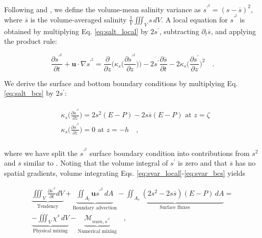 \documentclass[draft]{agujournal2019}
\begin{document}
Following  and , we define the volume-mean salinity variance as $s^{\prime^2} = (s-\overline{s})^2$, where $\overline{s}$ is the volume-averaged salinity $\frac{1}{V} \iiint_V s \, dV$. A local equation for $s^{\prime^2}$ is obtained by multiplying Eq. \ref{eq:salt_local} by $2s^{\prime}$, subtracting $\partial_t \overline{s}$, and applying the product rule:
\begin{linenomath*}
\begin{equation} \label{eq:svar_local}
    \frac{\partial s^{\prime^2}}{\partial t} + \textbf{u} \cdot \nabla s^{\prime^2}   = \frac{\partial}{\partial z} \bigg(\kappa_s \bigg(\frac{\partial s^{\prime^2}}{\partial z} \bigg) \bigg) - 2s^{\prime} \frac{\partial \overline{s}}{\partial t} -2 \kappa_s \bigg(\frac{\partial s^\prime}{\partial z} \bigg)^2 \quad .
\end{equation}
\end{linenomath*}
We derive the surface and bottom boundary conditions by multiplying Eq. \ref{eq:salt_bcs} by $2s^{\prime}$:
\begin{linenomath*}
\begin{align} \label{eq:svar_bcs}
    \begin{split}
         & \kappa_s \bigg({\frac{\partial s^{\prime^2}}{\partial z}} \bigg) = 2s^2(E-P) -2s \overline{s}(E-P) \,\, \textrm{at} \,\, z = \zeta \\
         & \kappa_s \bigg({\frac{\partial s^{\prime^2}}{\partial z}} \bigg) = 0 \,\, \textrm{at} \,\, z = -h \quad ,\\
    \end{split}
\end{align}
\end{linenomath*}
where we have split the $s^{\prime^2}$ surface boundary condition into contributions from $s^2$ and $\overline{s}$ similar to . 
Noting that the volume integral of $s^\prime$ is zero and that $\overline{s}$ has no spatial gradients, volume integrating Eqs.  \ref{eq:svar_local}-\ref{eq:svar_bcs} yields
\begin{linenomath*}
\begin{equation} \label{eq:svar_int}
    \begin{split}
        \underbrace{\iiint_V \frac{\partial s^{\prime^2}}{\partial t} dV}_{\text{Tendency}} + \underbrace{\iint_{A_l} \textbf{u}s^{\prime^2} \, d A}_{\text{Boundary advection}}  - \underbrace{\iint_{A_{v}}(2s^2-2s \overline{s})(E-P) \, dA}_{\text{Surface fluxes}} = \\
        \underbrace{-\iiint_V \chi^s  \, dV}_{\text{Physical mixing}} - \underbrace{\mathcal{M}_{num, s^{\prime^2}}}_\text{Numerical mixing} \quad ,
   \end{split}
\end{equation}
\end{linenomath*}
\end{document}
